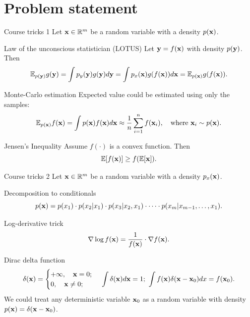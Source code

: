 \section{Problem statement}
\begin{frame}{Course tricks 1}
	Let $\mathbf{x} \in \mathbb{R}^m$ be a random variable with a density $p(\mathbf{x})$.
	\begin{block}{Law of the unconscious statistician (LOTUS)}
		Let $\mathbf{y}=f(\mathbf{x})$ with density $p(\mathbf{y})$. Then
		\[
			\mathbb{E}_{p(\mathbf{y})} g(\mathbf{y}) = \int p_y(\mathbf{y}) g(\mathbf{y}) d \mathbf{y} = \int p_x(\mathbf{x}) g(f(\mathbf{x})) d \mathbf{x} = \mathbb{E}_{p(\mathbf{x})} g(f(\mathbf{x})).
		\]
		\vspace{-0.4cm}
	\end{block}
	\begin{block}{Monte-Carlo estimation}
		Expected value could be estimated using only the samples:
		\[
			\mathbb{E}_{p(\mathbf{x})} f(\mathbf{x}) = \int p(\mathbf{x}) f(\mathbf{x}) d \mathbf{x} \approx \frac{1}{n} \sum_{i=1}^n f(\mathbf{x}_i), \quad 
			\text{where } \mathbf{x}_i \sim p(\mathbf{x}).
		\]
		\vspace{-0.4cm}
	\end{block}
	\begin{block}{Jensen's Inequality}
		Assume $f(\cdot)$ is a convex function. Then
		\[
			\mathbb{E} [f(\mathbf{x})] \geq f(\mathbb{E}[\mathbf{x}]).
		\]
	\end{block}
\end{frame}
\begin{frame}{Course tricks 2}
	Let $\mathbf{x} \in \mathbb{R}^m$ be a random variable with a density $p_x(\mathbf{x})$.
	\begin{block}{Decomposition to conditionals}
	\vspace{-0.5cm}
	\[
		p(\mathbf{x}) = p(x_1) \cdot p(x_2 | x_1) \cdot p(x_3 | x_2, x_1) \cdot \dots \cdot p(x_m|x_{m-1},\dots,x_1).
	\]
	\vspace{-0.4cm}
	\end{block}
	\begin{block}{Log-derivative trick}
		\[
			\nabla \log f(\mathbf{x}) = \frac{1}{f(\mathbf{x})} \cdot \nabla f(\mathbf{x}).
		\]
		\vspace{-0.4cm}
	\end{block}
		
	\begin{block}{Dirac delta function}
		\vspace{-0.5cm}
		\[
			\delta(\mathbf{x}) = 
			\begin{cases}
				+\infty, \quad \mathbf{x} = 0; \\
				0, \quad \mathbf{x} \neq 0;
			\end{cases} \, 
			\int \delta(\mathbf{x}) d\mathbf{x} = 1; \,\, 
			\int f(\mathbf{x}) \delta (\mathbf{x} - \mathbf{x}_0) dx = f(\mathbf{x}_0).
		\]
		We could treat any deterministic variable $\mathbf{x}_0$ as a random variable with density $p(\mathbf{x}) = \delta(\mathbf{x} - \mathbf{x}_0)$.
	\end{block}
\end{frame}
